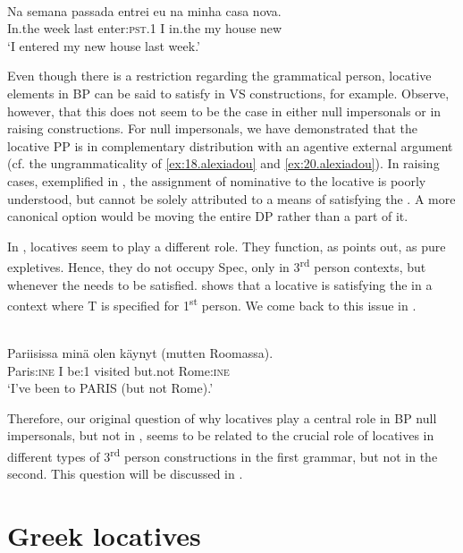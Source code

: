 \documentclass[output=paper]{LSP/langsci}
\begin{document}
\ea\label{ex:28.alexiadou}
\\
\gll {\upshape *} Na semana passada entrei eu na minha casa nova.\\
     {} In.the week last enter:\textsc{pst}.1 I in.the my house new\\
\glt ‘I entered my new house last week.’
\z

Even though there is a restriction regarding the grammatical person, locative elements in BP can be said to satisfy  in VS constructions, for example. Observe, however, that this does not seem to be the case in either null impersonals or in  raising constructions. For null impersonals, we have demonstrated that the locative PP is in complementary distribution with an agentive external argument (cf. the ungrammaticality of \ref{ex:18.alexiadou} and \ref{ex:20.alexiadou}). In  raising cases, exemplified in , the assignment of nominative  to the locative is poorly understood, but cannot be solely attributed to a means of satisfying the . A more canonical option would be moving the entire DP rather than a part of it.

In , locatives seem to play a different role. They function, as \citet{Holmberg2005} points out, as pure expletives. Hence, they do not occupy Spec, only in 3\textsuperscript{rd} person contexts, but whenever the  needs to be satisfied.  shows that a locative is satisfying the  in a context where T is specified for 1\textsuperscript{st} person. We come back to this issue in .


\ea\label{ex:29.alexiadou}
\\
\gll Pariisissa minä olen käynyt (mutten Roomassa).\\
 Paris:\textsc{ine} I be:1 visited but.not Rome:\textsc{ine}\\
\glt ‘I've been to PARIS (but not Rome).’
\z

Therefore, our original question of why locatives play a central role in BP null impersonals, but not in , seems to be related to the crucial role of locatives in different types of 3\textsuperscript{rd} person constructions in the first grammar, but not in the second. This question will be discussed in .

\section{Greek locatives}\label{§5.alexiadou}
\end{document}
